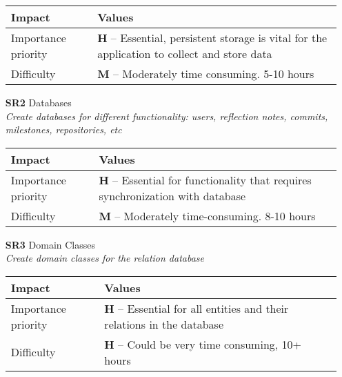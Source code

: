 \begin{itemize}
        \begin{tabular}{| l | p{7cm} |}
            \hline
            \rowcolor[gray]{0.8}
            \textbf{Impact} & \textbf{Values} \\
            \hline
            Importance priority & \textbf{H} -- Essential, persistent storage is vital for the application to collect and store data\\
            Difficulty & \textbf{M} -- Moderately time consuming. 5-10 hours\\
            \hline
        \end{tabular}
    \vspace{0.5cm}

    \item[\textbf{SR2}] Databases\\
        \textit{\small{Create databases for different functionality: users, reflection notes, commits, milestones, repositories, etc}}

        \begin{tabular}{| l | p{7cm} |}
            \hline
            \rowcolor[gray]{0.8}
            \textbf{Impact} & \textbf{Values} \\
            \hline
            Importance priority & \textbf{H} -- Essential for functionality that requires synchronization with database\\
            Difficulty & \textbf{M} -- Moderately time-consuming. 8-10 hours\\
            \hline
        \end{tabular}
    \vspace{0.5cm}

    \item[\textbf{SR3}] Domain Classes\\
        \textit{\small{Create domain classes for the relation database}}

        \begin{tabular}{| l | p{7cm} |}
            \hline
            \rowcolor[gray]{0.8}
            \textbf{Impact} & \textbf{Values} \\
            \hline
            Importance priority & \textbf{H} -- Essential for all entities and their relations in the database \\
            Difficulty & \textbf{H} -- Could be very time consuming, 10+ hours \\
            \hline
        \end{tabular}
    \vspace{0.5cm}
\end{itemize}

